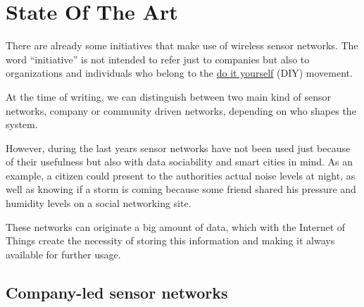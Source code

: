 \chapter{State Of The Art} %

\label{Chapter2} %



There are already some initiatives that make use of wireless sensor networks. The word ``initiative'' is not intended to refer just to companies but also to organizations and individuals who belong to the \href{https://en.wikipedia.org/wiki/Do_it_yourself}{do it yourself} (DIY) movement.

At the time of writing, we can distinguish between two main kind of sensor networks, company or community driven networks, depending on who shapes the system.

However, during the last years sensor networks have not been used just because of their usefulness but also with data sociability and smart cities in mind. As an example, a citizen could present to the authorities actual noise levels at night, as well as knowing if a storm is coming because some friend shared his pressure and humidity levels on a social networking site.

These networks can originate a big amount of data, which with the Internet of Things create the necessity of storing this information and making it always available for further usage.


\section{Company-led sensor networks}

%
%

